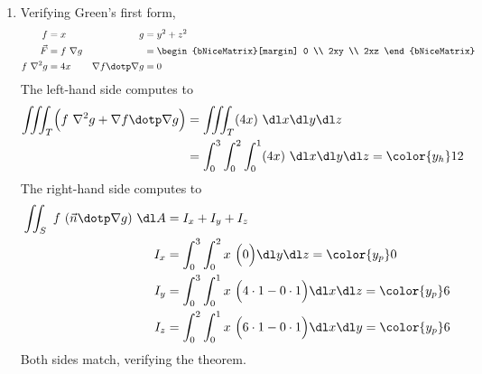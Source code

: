 \begin{enumerate}
    \item Verifying Green's first form,
          \begin{align}
              f                       & = x                            &
              g                       & = y^2 + z^2                      \\
              \vec{F}                 & = f\ \nabla g                  &
                                      & =  \begin{bNiceMatrix}[margin]
                                               0 \\ 2xy \\ 2xz
                                           \end{bNiceMatrix}    \\
              f\ \nabla^2 g           & = 4x                           &
              \nabla f \dotp \nabla g & = 0
          \end{align}
          The left-hand side computes to
          \begin{align}
              \iiint_T \Bigl( f\ \nabla^2 g + \nabla f \dotp \nabla g \Bigr)
               & = \iiint_T (4x)\ \dl x \dl y \dl z                               \\
               & = \int_{0}^{3} \int_{0}^{2} \int_{0}^{1} (4x)\ \dl x \dl y \dl z
              = \color{y_h} 12
          \end{align}
          The right-hand side computes to
          \begin{align}
              \iint_S\ f\ (\vec{n} \dotp \nabla g)\ \dl A
                  & = I_x + I_y + I_z                                           \\
              I_x & = \int_{0}^{3} \int_{0}^{2} x\ \Bigl( 0
              \Bigr) \dl y \dl z = \color{y_p} 0                                \\
              I_y & = \int_{0}^{3} \int_{0}^{1} x\ \Bigl( 4 \cdot 1 - 0 \cdot 1
              \Bigr) \dl x \dl z = \color{y_p} 6                                \\
              I_z & = \int_{0}^{2} \int_{0}^{1} x\ \Bigl( 6 \cdot 1 - 0 \cdot 1
              \Bigr) \dl x \dl y = \color{y_p} 6
          \end{align}
          Both sides match, verifying the theorem.


\end{enumerate}
